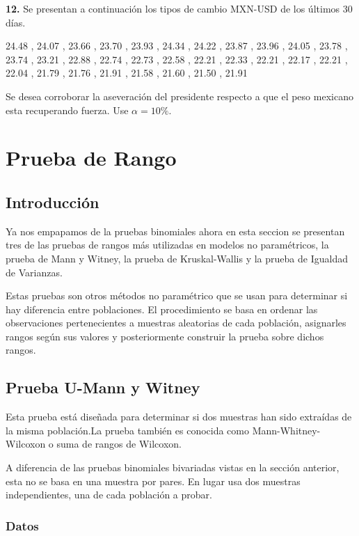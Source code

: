 \documentclass[
  a4paper,
  oneside,
  openany]{book}
\begin{document}
\textbf{12.} Se presentan a continuación los tipos de cambio MXN-USD de los últimos 30 días.

24.48 ,
24.07 ,
23.66 ,
23.70 ,
23.93 ,
24.34 ,
24.22 ,
23.87 ,
23.96 ,
24.05 ,
23.78 ,
23.74 ,
23.21 ,
22.88 ,
22.74 ,
22.73 ,
22.58 ,
22.21 ,
22.33 ,
22.21 ,
22.17 ,
22.21 ,
22.04 ,
21.79 ,
21.76 ,
21.91 ,
21.58 ,
21.60 ,
21.50 ,
21.91

Se desea corroborar la aseveración del presidente respecto a que el peso mexicano esta recuperando fuerza. Use \(\alpha=10\%\).

\hypertarget{part-prueba-de-rango}{%
\part{Prueba de Rango}\label{part-prueba-de-rango}}

\hypertarget{introducciuxf3n-2}{%
\chapter*{Introducción}\label{introducciuxf3n-2}}


Ya nos empapamos de la pruebas binomiales ahora en esta seccion se presentan tres de las pruebas de rangos más utilizadas en modelos no paramétricos, la prueba de Mann y Witney, la prueba de Kruskal-Wallis y la prueba de Igualdad de Varianzas.

Estas pruebas son otros métodos no paramétrico que se usan para determinar si hay diferencia entre poblaciones. El procedimiento se basa en ordenar las observaciones pertenecientes a muestras aleatorias de cada población, asignarles rangos según sus valores y posteriormente construir la prueba sobre dichos rangos.

\hypertarget{prueba-u-mann-y-witney}{%
\chapter{Prueba U-Mann y Witney}\label{prueba-u-mann-y-witney}}

Esta prueba está diseñada para determinar si dos muestras han sido extraídas de la misma población.La prueba también es conocida como Mann-Whitney-Wilcoxon o suma de rangos de Wilcoxon.

A diferencia de las pruebas binomiales bivariadas vistas en la sección anterior, esta no se basa en una muestra por pares. En lugar usa dos muestras independientes, una de cada población a probar.

\hypertarget{datos-5}{%
\section{Datos}\label{datos-5}}
\end{document}
